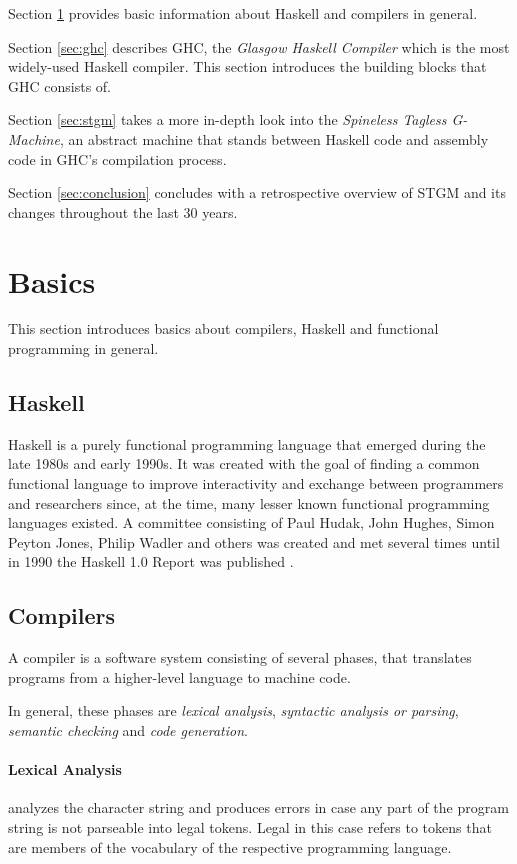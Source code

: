 \documentclass[runningheads]{llncs}
\begin{document}
Section \ref{sec:basics} provides basic information about Haskell and compilers in general.

Section \ref{sec:ghc} describes GHC, the \textit{Glasgow Haskell Compiler} which is the most widely-used Haskell compiler. This section introduces the building blocks that GHC consists of.

Section \ref{sec:stgm} takes a more in-depth look into the \textit{Spineless Tagless G-Machine}, an abstract machine that stands between Haskell code and assembly code in GHC's compilation process.

Section \ref{sec:conclusion} concludes with a retrospective overview of STGM and its changes throughout the last 30 years.



\section{Basics}
\label{sec:basics}

This section introduces basics about compilers, Haskell and functional programming in general.

\subsection{Haskell}
Haskell is a purely functional programming language that emerged during the late 1980s and early 1990s. It was created with the goal of finding a common functional language to improve interactivity and exchange between programmers and researchers since, at the time, many lesser known functional programming languages existed. A committee consisting of Paul Hudak, John Hughes, Simon Peyton Jones, Philip Wadler and others was created and met several times until in 1990 the Haskell 1.0 Report was published \cite{hudak2007history}.

\subsection{Compilers}
A compiler is a software system consisting of several phases, that translates programs from a higher-level language to machine code. \cite{muchnick1997advanced}

In general, these phases are \textit{lexical analysis}, \textit{syntactic analysis or parsing}, \textit{semantic checking} and \textit{code generation}. \cite{muchnick1997advanced}

\paragraph{Lexical Analysis} analyzes the character string and produces errors in case any part of the program string is not parseable into legal tokens. Legal in this case refers to tokens that are members of the vocabulary of the respective programming language.
\end{document}
